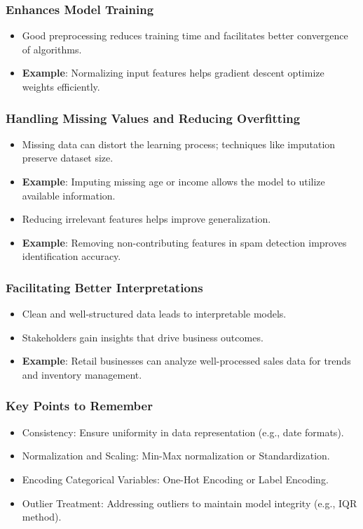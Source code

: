 \documentclass[aspectratio=169]{beamer}
\begin{document}
\begin{frame}[fragile]
    \frametitle{Enhances Model Training}
    \begin{itemize}
        \item Good preprocessing reduces training time and facilitates better convergence of algorithms.
        \item \textbf{Example}: Normalizing input features helps gradient descent optimize weights efficiently.
    \end{itemize}
\end{frame}

\begin{frame}[fragile]
    \frametitle{Handling Missing Values and Reducing Overfitting}
    \begin{itemize}
        \item Missing data can distort the learning process; techniques like imputation preserve dataset size.
        \item \textbf{Example}: Imputing missing age or income allows the model to utilize available information.
    \end{itemize}
    
    \begin{itemize}
        \setlength{\itemindent}{-1em}
        \item Reducing irrelevant features helps improve generalization.
        \item \textbf{Example}: Removing non-contributing features in spam detection improves identification accuracy.
    \end{itemize}
\end{frame}

\begin{frame}[fragile]
    \frametitle{Facilitating Better Interpretations}
    \begin{itemize}
        \item Clean and well-structured data leads to interpretable models.
        \item Stakeholders gain insights that drive business outcomes.
        \item \textbf{Example}: Retail businesses can analyze well-processed sales data for trends and inventory management.
    \end{itemize}
\end{frame}

\begin{frame}[fragile]
    \frametitle{Key Points to Remember}
    \begin{itemize}
        \item Consistency: Ensure uniformity in data representation (e.g., date formats).
        \item Normalization and Scaling: Min-Max normalization or Standardization.
        \item Encoding Categorical Variables: One-Hot Encoding or Label Encoding.
        \item Outlier Treatment: Addressing outliers to maintain model integrity (e.g., IQR method).
    \end{itemize}
\end{frame}
\end{document}
